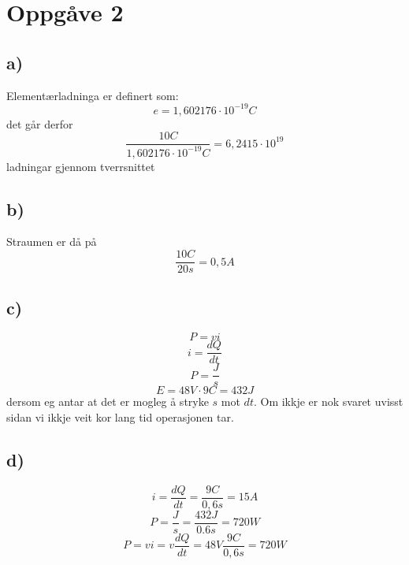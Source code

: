 \documentclass[12pt,a4paper]{article}
\begin{document}
  \section{Oppgåve 2}
    \subsection{a)}
      Elementærladninga er definert som: 
      \begin{equation}
        e = 1,602176\cdot10^{-19}C
      \end{equation}
      det går derfor
      \begin{equation}
        \frac{10C}{1,602176\cdot10^{-19}C}=6,2415\cdot10^{19}
      \end{equation}
      ladningar gjennom tverrsnittet

    \subsection{b)}
      Straumen er då på
      \begin{equation}
        \frac{10C}{20s}=0,5A
      \end{equation}

    \subsection{c)}
      \begin{equation}
        P = vi
      \end{equation}
      \begin{equation}
        i = \frac{dQ}{dt}
      \end{equation}
      \begin{equation}
        P = \frac{J}{s}
      \end{equation}
      \begin{equation}
        E = 48V\cdot9C=432J
      \end{equation}
      dersom eg antar at det er mogleg å stryke $s$ mot $dt$. Om ikkje er nok svaret
      uvisst sidan vi ikkje veit kor lang tid operasjonen tar.

    \subsection{d)}
      \begin{equation}
        i = \frac{dQ}{dt} = \frac{9C}{0,6s}=15A
      \end{equation}
      \begin{equation}
        P = \frac{J}{s} = \frac{432J}{0.6s}=720W
      \end{equation}
      \begin{equation}
        P= vi = v\frac{dQ}{dt} = 48V\frac{9C}{0,6s}=720W
      \end{equation}
\end{document}
